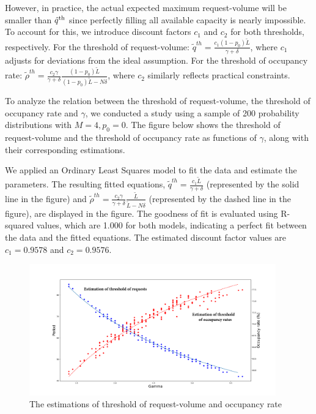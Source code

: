 However, in practice, the actual expected maximum request-volume will be smaller than $\hat{q}^{\textup{th}}$ since perfectly filling all available capacity is nearly impossible. To account for this, we introduce discount factors $c_1$ and $c_2$ for both thresholds, respectively. For the threshold of request-volume:
$\tilde{q}^{th} =  \frac{c_1 (1-p_0) \tilde{L}}{\gamma + \delta}$, where $c_1$ adjusts for deviations from the ideal assumption.
For the threshold of occupancy rate:
$\tilde{\rho}^{th} = \frac{c_2 \gamma}{\gamma +\delta} \frac{(1-p_0) \tilde{L}}{(1-p_0) \tilde{L}-N \delta}$, where $c_2$ similarly reflects practical constraints.

To analyze the relation between the threshold of request-volume, the threshold of occupancy rate and $\gamma$, we conducted a study using a sample of 200 probability distributions with $M=4, p_0=0$. The figure below shows the threshold of request-volume and the threshold of occupancy rate as functions of $\gamma$, along with their corresponding estimations.

We applied an Ordinary Least Squares model to fit the data and estimate the parameters. The resulting fitted equations, $\tilde{q}^{th} = \frac{c_1 \tilde{L}}{\gamma + \delta}$ (represented by the solid line in the figure) and $\tilde{\rho}^{th} = \frac{c_2 \gamma}{\gamma + \delta} \frac{\tilde{L}}{\tilde{L}-N \delta}$ (represented by the dashed line in the figure), are displayed in the figure. The goodness of fit is evaluated using R-squared values, which are 1.000 for both models, indicating a perfect fit between the data and the fitted equations. The estimated discount factor values are $c_1 = 0.9578$ and $c_2 = 0.9576$.

\begin{figure}[ht]
  \caption{The estimations of threshold of request-volume and occupancy rate}
  \centering
    \includegraphics[width=0.95\textwidth]{./Figures/200_random.pdf}
\end{figure}

